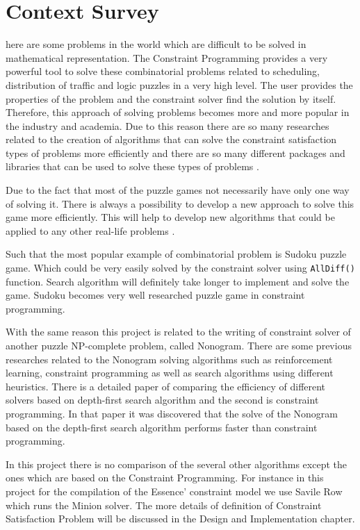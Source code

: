 \let\textcircled=\pgftextcircled
\chapter{Context Survey}
\label{chap:2}
here are some problems in the world which are difficult to be solved in mathematical representation. The Constraint Programming provides a very powerful tool to solve these combinatorial problems related to scheduling, distribution of traffic and logic puzzles in a very high level. The user provides the properties of the problem and the constraint solver find the solution by itself. Therefore, this approach of solving problems becomes more and more popular in the industry and academia. Due to this reason there are so many researches related to the creation of algorithms that can solve the constraint satisfaction types of problems more efficiently and there are so many different packages and libraries that can be used to solve these types of problems \cite{savile_row_paper}. 

Due to the fact that most of the puzzle games not necessarily have only one way of solving it. There is always a possibility to develop a new approach to solve this game more efficiently. This will help to develop new algorithms that could be applied to any other real-life problems \cite{nonogram_with_multiple_solutions}. 

Such that the most popular example of combinatorial problem is Sudoku puzzle game. Which could be very easily solved by the constraint solver using \texttt{AllDiff()} function. Search algorithm will definitely take longer to implement and solve the game. Sudoku becomes very well researched puzzle game in constraint programming\cite{Sudoku_as_CP}.

With the same reason this project is related to the writing of constraint solver of another puzzle NP-complete problem, called Nonogram. There are some previous researches related to the Nonogram solving algorithms such as reinforcement learning, constraint programming\cite{nonogram_reinforcement,nonogram_good} as well as search algorithms using different heuristics\cite{Apt2003a}. There is a detailed paper of comparing the efficiency of different solvers based on depth-first search algorithm and the second is constraint programming. In that paper it was discovered that the solve of the Nonogram based on the depth-first search algorithm performs faster than constraint programming. 

In this project there is no comparison of the several other algorithms except the ones which are based on the Constraint Programming. For instance in this project for the compilation of the Essence' constraint model we use Savile Row which runs the Minion solver. The more details of definition of Constraint Satisfaction Problem will be discussed in the Design and Implementation chapter. 
